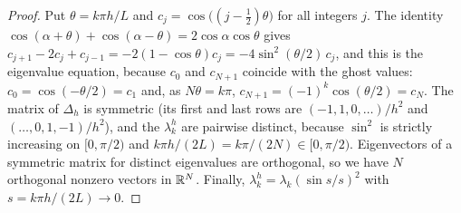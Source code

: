 \begin{proof}
Put $\theta=k\pi h/L$ and $c_j=\cos\big((j-\frac12)\theta\big)$ for all integers $j$.
The identity $\cos(\alpha+\theta)+\cos(\alpha-\theta)=2\cos\alpha\cos\theta$ gives
$c_{j+1}-2c_j+c_{j-1}=-2(1-\cos\theta)c_j=-4\sin^2(\theta/2)\,c_j$, and this is the
eigenvalue equation, because $c_0$ and $c_{N+1}$ coincide with the ghost values:
$c_0=\cos(-\theta/2)=c_1$ and, as $N\theta=k\pi$, $c_{N+1}=(-1)^k\cos(\theta/2)=c_N$. The matrix of $\Delta_h$ is symmetric (its first and last rows are
$(-1,1,0,\dots)/h^2$ and $(\dots,0,1,-1)/h^2$), and the $\lambda^h_k$ are pairwise
distinct, because $\sin^2$ is strictly increasing on $[0,\pi/2)$ and
$k\pi h/(2L)=k\pi/(2N)\in[0,\pi/2)$. Eigenvectors of a symmetric matrix for distinct
eigenvalues are orthogonal, so we have $N$ orthogonal nonzero vectors in $\mathbb{R}^N$.
Finally, $\lambda^h_k=\lambda_k(\sin s/s)^2$ with $s=k\pi h/(2L)\to0$.
\end{proof}



